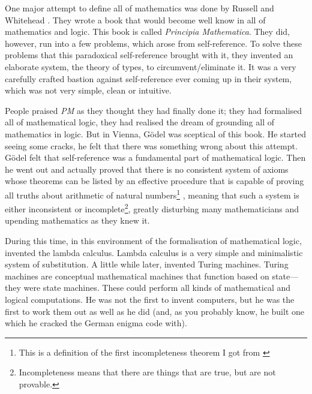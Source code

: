 \documentclass[11pt]{article}
\begin{document}
One major attempt to define all of mathematics was done by Russell and
Whitehead \parencite{pm1, pm2, pm3}. They wrote a book that would become well
know in all of mathematics and logic. This book is called \emph{Principia
Mathematica}. They did, however, run into a few problems, which arose from
self-reference. To solve these problems that this paradoxical self-reference
brought with it, they invented an elaborate system, the theory of types, to
circumvent/eliminate it.  It was a very carefully crafted bastion against
self-reference ever coming up in their system, which was not very simple, clean
or intuitive.

People praised \emph{PM} as they thought they had finally done it; they had
formalised all of mathematical logic, they had realised the dream of grounding
all of mathematics in logic. But in Vienna, Gödel was sceptical of this book.
He started seeing some cracks, he felt that there was something wrong about
this attempt. Gödel felt that self-reference was a fundamental part of
mathematical logic. Then he went out and actually proved that there is no
consistent system of axioms whose theorems can be listed by an effective
procedure that is capable of proving all truths about arithmetic of natural
numbers\footnote{This is a definition of the first incompleteness theorem I got
from \textcite{wiki:Incompleteness_theorems}} \parencite{godel1931}, meaning
that such a system is either inconsistent or incomplete\footnote{Incompleteness
means that there are things that are true, but are not provable.}, greatly
disturbing many mathematicians and upending mathematics as they knew it.

During this time, in this environment of the formalisation of mathematical
logic, \textcite{church1932} invented the lambda calculus. Lambda calculus is a
very simple and minimalistic system of substitution. A little while later,
\textcite{turing1936, turing1937correction} invented Turing machines. Turing
machines are conceptual mathematical machines that function based on
state---they were state machines. These could perform all kinds of mathematical
and logical computations. He was not the first to invent computers, but he was
the first to work them out as well as he did (and, as you probably know, he
built one which he cracked the German enigma code with).
\end{document}
